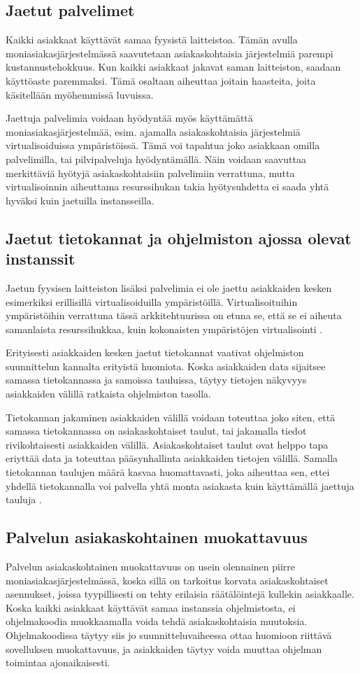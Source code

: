 \subsection{Jaetut palvelimet}
Kaikki asiakkaat käyttävät samaa fyysistä laitteistoa. Tämän avulla moniasiakasjärjestelmässä saavutetaan asiakaskohtaisia järjestelmiä parempi kustannustehokkuus. Kun kaikki asiakkaat jakavat saman laitteiston, saadaan käyttöaste paremmaksi. Tämä osaltaan aiheuttaa joitain haasteita, joita käsitellään myöhemmissä luvuissa.

Jaettuja palvelimia voidaan hyödyntää myös käyttämättä moniasiakasjärjestelmää, esim. ajamalla asiakaskohtaisia järjestelmiä virtualisoiduissa ympäristöissä. Tämä voi tapahtua joko asiakkaan omilla palvelimilla, tai pilvipalveluja hyödyntämällä. Näin voidaan saavuttaa merkittäviä hyötyjä asiakaskohtaisiin palvelimiin verrattuna, mutta virtualisoinnin aiheuttama resurssihukan takia hyötysuhdetta ei saada yhtä hyväksi kuin jaetuilla instansseilla.

\subsection{Jaetut tietokannat ja ohjelmiston ajossa olevat instanssit}
Jaetun fyysisen laitteiston lisäksi palvelimia ei ole jaettu asiakkaiden kesken esimerkiksi erillisillä virtualisoiduilla ympäristöillä. Virtualisoituihin ympäristöihin verrattuna tässä arkkitehtuurissa on etuna se, että se ei aiheuta samanlaista resurssihukkaa, kuin kokonaisten ympäristöjen virtualisointi \cite{huber2011evaluating}.

Erityisesti asiakkaiden kesken jaetut tietokannat vaativat ohjelmiston suunnittelun kannalta erityistä huomiota. Koska asiakkaiden data sijaitsee samassa tietokannassa ja samoissa tauluissa, täytyy tietojen näkyvyys asiakkaiden välillä ratkaista ohjelmiston tasolla.

Tietokannan jakaminen asiakkaiden välillä voidaan toteuttaa joko siten, että samassa tietokannassa on asiakaskohtaiset taulut, tai jakamalla tiedot rivikohtaisesti asiakkaiden välillä. Asiakaskohtaiset taulut ovat helppo tapa eriyttää data ja toteuttaa pääsynhallinta asiakkaiden tietojen välillä. Samalla tietokannan taulujen määrä kasvaa huomattavasti, joka aiheuttaa sen, ettei yhdellä tietokannalla voi palvella yhtä monta asiakasta kuin käyttämällä jaettuja tauluja \cite{chong2006multi}.

\subsection{Palvelun asiakaskohtainen muokattavuus}
Palvelun asiakaskohtainen muokattavuus on usein olennainen piirre moniasiakasjärjestelmässä, koska sillä on tarkoitus korvata asiakaskohtaiset asennukset, joissa tyypillisesti on tehty erilaisia räätälöintejä kullekin asiakkaalle. Koska kaikki asiakkaat käyttävät samaa instanssia ohjelmistosta, ei ohjelmakoodia muokkaamalla voida tehdä asiakaskohtaisia muutoksia. Ohjelmakoodissa täytyy siis jo suunnitteluvaiheessa ottaa huomioon riittävä sovelluksen muokattavuus, ja asiakkaiden täytyy voida muuttaa ohjelman toimintaa ajonaikaisesti.

